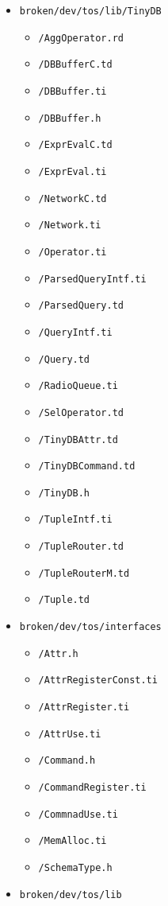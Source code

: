 \documentclass[11pt]{article}
\renewcommand{\baselinestretch}{1.2}
\newcommand{\docroot}{broken/dev}
\begin{document}
\renewcommand{\baselinestretch}{.9}\rm
\begin{itemize}
\item {\tt \docroot/tos/lib/TinyDB}
\begin{itemize}
\item {\tt /AggOperator.rd}
\item {\tt /DBBufferC.td}
\item {\tt /DBBuffer.ti}
\item {\tt /DBBuffer.h}
\item {\tt /ExprEvalC.td}
\item {\tt /ExprEval.ti}
\item {\tt /NetworkC.td}
\item {\tt /Network.ti}
\item {\tt /Operator.ti}
\item {\tt /ParsedQueryIntf.ti}
\item {\tt /ParsedQuery.td}
\item {\tt /QueryIntf.ti}
\item {\tt /Query.td}
\item {\tt /RadioQueue.ti}
\item {\tt /SelOperator.td}
\item {\tt /TinyDBAttr.td}
\item {\tt /TinyDBCommand.td}
\item {\tt /TinyDB.h}
\item {\tt /TupleIntf.ti}
\item {\tt /TupleRouter.td}
\item {\tt /TupleRouterM.td}
\item {\tt /Tuple.td}
\end{itemize}
\item {\tt \docroot/tos/interfaces}
\begin{itemize}
\item {\tt /Attr.h}
\item {\tt /AttrRegisterConst.ti}
\item {\tt /AttrRegister.ti}
\item {\tt /AttrUse.ti}
\item {\tt /Command.h}
\item {\tt /CommandRegister.ti}
\item {\tt /CommnadUse.ti}
\item {\tt /MemAlloc.ti}
\item {\tt /SchemaType.h}
\end{itemize}
\item {\tt \docroot/tos/lib}
\begin{itemize}

\end{itemize}
\end{itemize}
\end{document}
